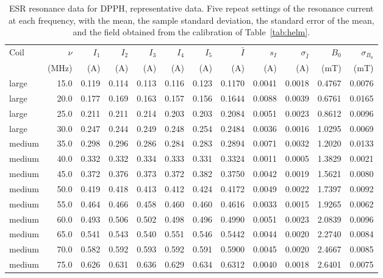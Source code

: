 \documentclass[11pt,a4paper]{article}
\begin{document}
\begin{table}[H]
\centering
\caption{ESR resonance data for DPPH, representative data. Five repeat settings of the resonance
current at each frequency, with the mean, the sample standard deviation, the standard error of the
mean, and the field obtained from the calibration of Table~\ref{tab:helm}.}
\label{tab:a2}
\scriptsize
\setlength{\tabcolsep}{3.4pt}
\begin{tabular}{lrrrrrrrrrrr}
\toprule
Coil & $\nu$ & $I_1$ & $I_2$ & $I_3$ & $I_4$ & $I_5$ & $\bar{I}$ & $s_I$ & $\sigma_{\bar{I}}$ & $B_0$ & $\sigma_{B_0}$ \\
 & (MHz) & (A) & (A) & (A) & (A) & (A) & (A) & (A) & (A) & (mT) & (mT) \\
\midrule
large & 15.0 & 0.119 & 0.114 & 0.113 & 0.116 & 0.123 & 0.1170 & 0.0041 & 0.0018 & 0.4767 & 0.0076 \\
large & 20.0 & 0.177 & 0.169 & 0.163 & 0.157 & 0.156 & 0.1644 & 0.0088 & 0.0039 & 0.6761 & 0.0165 \\
large & 25.0 & 0.211 & 0.211 & 0.214 & 0.203 & 0.203 & 0.2084 & 0.0051 & 0.0023 & 0.8612 & 0.0096 \\
large & 30.0 & 0.247 & 0.244 & 0.249 & 0.248 & 0.254 & 0.2484 & 0.0036 & 0.0016 & 1.0295 & 0.0069 \\
medium & 35.0 & 0.298 & 0.296 & 0.286 & 0.284 & 0.283 & 0.2894 & 0.0071 & 0.0032 & 1.2020 & 0.0133 \\
medium & 40.0 & 0.332 & 0.332 & 0.334 & 0.333 & 0.331 & 0.3324 & 0.0011 & 0.0005 & 1.3829 & 0.0021 \\
medium & 45.0 & 0.372 & 0.376 & 0.373 & 0.372 & 0.382 & 0.3750 & 0.0042 & 0.0019 & 1.5621 & 0.0080 \\
medium & 50.0 & 0.419 & 0.418 & 0.413 & 0.412 & 0.424 & 0.4172 & 0.0049 & 0.0022 & 1.7397 & 0.0092 \\
medium & 55.0 & 0.464 & 0.466 & 0.458 & 0.460 & 0.460 & 0.4616 & 0.0033 & 0.0015 & 1.9265 & 0.0062 \\
medium & 60.0 & 0.493 & 0.506 & 0.502 & 0.498 & 0.496 & 0.4990 & 0.0051 & 0.0023 & 2.0839 & 0.0096 \\
medium & 65.0 & 0.541 & 0.543 & 0.540 & 0.551 & 0.546 & 0.5442 & 0.0044 & 0.0020 & 2.2740 & 0.0084 \\
medium & 70.0 & 0.582 & 0.592 & 0.593 & 0.592 & 0.591 & 0.5900 & 0.0045 & 0.0020 & 2.4667 & 0.0085 \\
medium & 75.0 & 0.626 & 0.631 & 0.636 & 0.629 & 0.634 & 0.6312 & 0.0040 & 0.0018 & 2.6401 & 0.0075 \\

\end{tabular}
\end{table}
\end{document}
